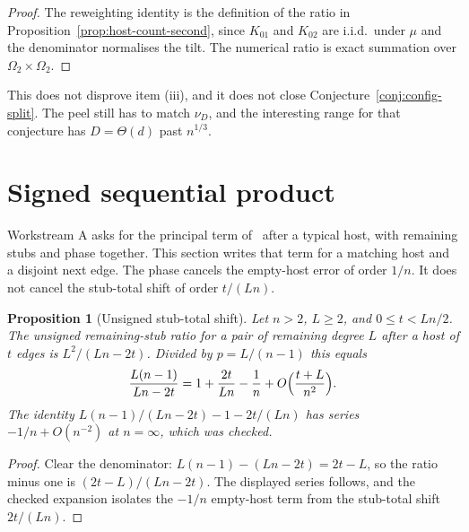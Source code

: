 \documentclass[11pt]{article}
\newtheorem{proposition}[theorem]{Proposition}
\begin{document}
\begin{proof}
The reweighting identity is the definition of the ratio in
Proposition~\ref{prop:host-count-second}, since \(K_{01}\) and \(K_{02}\) are
i.i.d.\ under \(\mu\) and the denominator normalises the tilt.
The numerical ratio is exact summation over \(\Omega_2\times\Omega_2\).
\end{proof}

This does not disprove item (iii), and it does not close
Conjecture~\ref{conj:config-split}.
The peel still has to match \(\nu_D\), and the interesting range for that
conjecture has \(D=\Theta(d)\) past \(n^{1/3}\).

\section{Signed sequential product}
\label{sec:signed}

Workstream A asks for the principal term of~\cite[Theorem~6]{Gao20} after a
typical host, with remaining stubs and phase together.
This section writes that term for a matching host and a disjoint next edge.
The phase cancels the empty-host error of order \(1/n\).
It does not cancel the stub-total shift of order \(t/(Ln)\).

\begin{proposition}[Unsigned stub-total shift]
\label{prop:unsigned-shift}
Let \(n>2\), \(L\ge 2\), and \(0\le t<Ln/2\). The unsigned remaining-stub
ratio for a pair of remaining degree \(L\) after a host of \(t\) edges is
\(L^2/(Ln-2t)\). Divided by \(p=L/(n-1)\) this equals
\[
\frac{L(n-1)}{Ln-2t}
=
1+\frac{2t}{Ln}-\frac1n+O\Bigl(\frac{t+L}{n^2}\Bigr).
\]
The identity
\(L(n-1)/(Ln-2t)-1-2t/(Ln)\)
has series \(-1/n+O(n^{-2})\) at \(n=\infty\), which was checked.
\end{proposition}

\begin{proof}
Clear the denominator:
\(L(n-1)-(Ln-2t)=2t-L\), so the ratio minus one is
\((2t-L)/(Ln-2t)\).
The displayed series follows, and the checked expansion isolates the
\(-1/n\) empty-host term from the stub-total shift \(2t/(Ln)\).
\end{proof}
\end{document}
